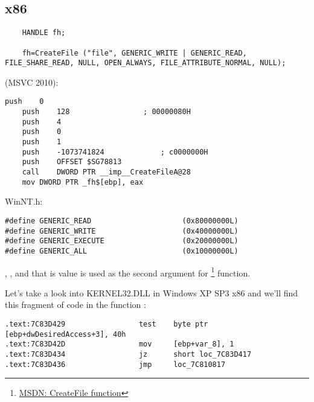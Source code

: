 \subsection{x86}


\begin{lstlisting}
	HANDLE fh;

	fh=CreateFile ("file", GENERIC_WRITE | GENERIC_READ, FILE_SHARE_READ, NULL, OPEN_ALWAYS, FILE_ATTRIBUTE_NORMAL, NULL);
\end{lstlisting}

 (MSVC 2010):

\begin{lstlisting}[caption=MSVC 2010]
	push	0
	push	128					; 00000080H
	push	4
	push	0
	push	1
	push	-1073741824				; c0000000H
	push	OFFSET $SG78813
	call	DWORD PTR __imp__CreateFileA@28
	mov	DWORD PTR _fh$[ebp], eax
\end{lstlisting}

 WinNT.h:

\begin{lstlisting}[caption=WinNT.h]
#define GENERIC_READ                     (0x80000000L)
#define GENERIC_WRITE                    (0x40000000L)
#define GENERIC_EXECUTE                  (0x20000000L)
#define GENERIC_ALL                      (0x10000000L)
\end{lstlisting}

, 
, 
{and that is value is used as the second argument for} \footnote{\href{http://msdn.microsoft.com/en-us/library/aa363858(VS.85).aspx}{MSDN: CreateFile function}} function.


{Let's take a look into KERNEL32.DLL in Windows XP SP3 x86 and we'll find
this fragment of code in the function :}

\begin{lstlisting}[caption=KERNEL32.DLL (Windows XP SP3 x86)]
.text:7C83D429                 test    byte ptr [ebp+dwDesiredAccess+3], 40h
.text:7C83D42D                 mov     [ebp+var_8], 1
.text:7C83D434                 jz      short loc_7C83D417
.text:7C83D436                 jmp     loc_7C810817
\end{lstlisting}

